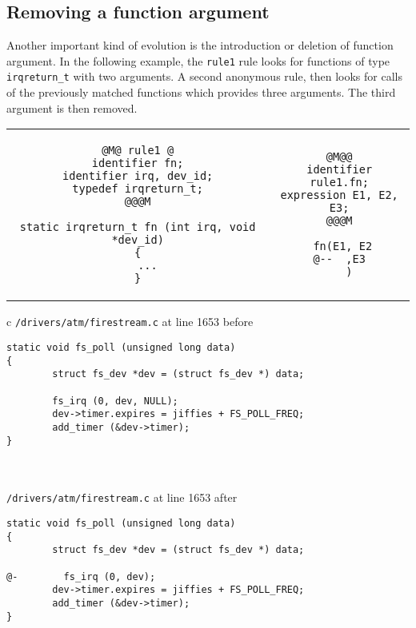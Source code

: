 \subsection{Removing a function argument}

Another important kind of evolution is the introduction or deletion of
function argument. In the following example, the \texttt{rule1} rule
looks for functions of type \texttt{irqreturn\_t} with two arguments. A
second anonymous rule, then looks for calls of the previously matched
functions which provides three arguments. The third argument is then
removed.

\begin{tabular}{c@{\hspace{1cm}}c}
\begin{lstlisting}[language=Cocci,name=arg]
@M@ rule1 @
identifier fn;
identifier irq, dev_id;
typedef irqreturn_t;
@@@M

static irqreturn_t fn (int irq, void *dev_id)
{
   ...
}

\end{lstlisting}
&
\begin{lstlisting}[language=Cocci,name=arg]
@M@@
identifier rule1.fn;
expression E1, E2, E3;
@@@M

 fn(E1, E2
@--  ,E3
   )
\end{lstlisting}\\
\end{tabular}

\begin{tabular}{c}
  \texttt{/drivers/atm/firestream.c} at line 1653 before\\
\begin{lstlisting}[language=PatchC]
static void fs_poll (unsigned long data)
{
        struct fs_dev *dev = (struct fs_dev *) data;

        fs_irq (0, dev, NULL);
        dev->timer.expires = jiffies + FS_POLL_FREQ;
        add_timer (&dev->timer);
}
\end{lstlisting}\\
\\
  \texttt{/drivers/atm/firestream.c} at line 1653 after\\
\begin{lstlisting}[language=PatchC]
static void fs_poll (unsigned long data)
{
        struct fs_dev *dev = (struct fs_dev *) data;

@-        fs_irq (0, dev);
        dev->timer.expires = jiffies + FS_POLL_FREQ;
        add_timer (&dev->timer);
}
\end{lstlisting}\\
\end{tabular}

